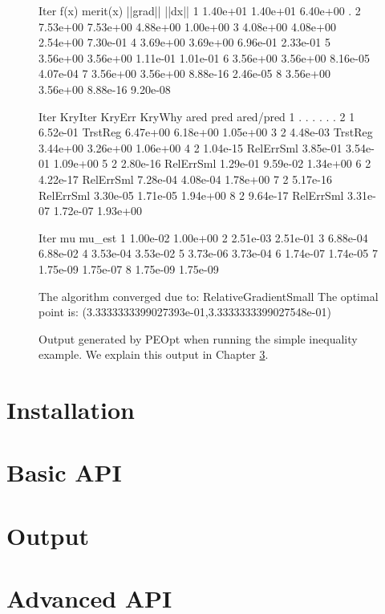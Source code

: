 \documentclass{report}
\begin{document}
\begin{figure}
\begin{lstPeopt}
Iter      f(x)      merit(x)  ||grad||  ||dx||    
1         1.40e+01  1.40e+01  6.40e+00  .         
2         7.53e+00  7.53e+00  4.88e+00  1.00e+00  
3         4.08e+00  4.08e+00  2.54e+00  7.30e-01  
4         3.69e+00  3.69e+00  6.96e-01  2.33e-01  
5         3.56e+00  3.56e+00  1.11e-01  1.01e-01  
6         3.56e+00  3.56e+00  8.16e-05  4.07e-04  
7         3.56e+00  3.56e+00  8.88e-16  2.46e-05  
8         3.56e+00  3.56e+00  8.88e-16  9.20e-08  
\end{lstPeopt}
\begin{lstPeopt}
Iter      KryIter   KryErr    KryWhy    ared      pred      ared/pred 
1         .         .         .         .         .         .         
2         1         6.52e-01  TrstReg   6.47e+00  6.18e+00  1.05e+00  
3         2         4.48e-03  TrstReg   3.44e+00  3.26e+00  1.06e+00  
4         2         1.04e-15  RelErrSml 3.85e-01  3.54e-01  1.09e+00  
5         2         2.80e-16  RelErrSml 1.29e-01  9.59e-02  1.34e+00  
6         2         4.22e-17  RelErrSml 7.28e-04  4.08e-04  1.78e+00  
7         2         5.17e-16  RelErrSml 3.30e-05  1.71e-05  1.94e+00  
8         2         9.64e-17  RelErrSml 3.31e-07  1.72e-07  1.93e+00 
\end{lstPeopt}
\begin{lstPeopt}
Iter      mu        mu_est    
1         1.00e-02  1.00e+00  
2         2.51e-03  2.51e-01  
3         6.88e-04  6.88e-02  
4         3.53e-04  3.53e-02  
5         3.73e-06  3.73e-04  
6         1.74e-07  1.74e-05  
7         1.75e-09  1.75e-07  
8         1.75e-09  1.75e-09  
\end{lstPeopt}
\begin{lstPeopt}
The algorithm converged due to: RelativeGradientSmall
The optimal point is: (3.3333333399027393e-01,3.3333333399027548e-01)
\end{lstPeopt}
\caption{Output generated by PEOpt when running the simple inequality example.  We explain this output in Chapter \ref{ch:Output}.}
\label{fig:simpleIneqOut}
\end{figure}

\chapter{Installation}\label{ch:Install}
\chapter{Basic API}\label{ch:Basic}
\chapter{Output}\label{ch:Output}
\chapter{Advanced API}\label{ch:Advanced}
\end{document}
